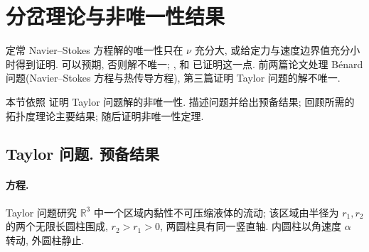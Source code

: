 \hypertarget{chapter-02-page-165}{}
\section{分岔理论与非唯一性结果}
\label{sec:ch2-bifurcation-nonuniqueness}

定常 Navier--Stokes 方程解的唯一性只在 $\nu$ 充分大, 或给定力与速度边界值充分小时得到证明. 可以预期, 否则解不唯一; ,  和  已证明这一点. 前两篇论文处理 Bénard 问题(Navier--Stokes 方程与热传导方程), 第三篇证明 Taylor 问题的解不唯一.

本节依照  证明 Taylor 问题解的非唯一性.  描述问题并给出预备结果;  回顾所需的拓扑度理论主要结果;  随后证明非唯一性定理.

\subsection{Taylor 问题. 预备结果}
\label{subsec:ch2-taylor-preliminaries}

\paragraph{方程.}
\label{subsec:ch2-taylor-equations}
Taylor 问题研究 $\mathbb R^3$ 中一个区域内黏性不可压缩液体的流动; 该区域由半径为 $r_1,r_2$ 的两个无限长圆柱围成, $r_2>r_1>0$, 两圆柱具有同一竖直轴. 内圆柱以角速度 $\alpha$ 转动, 外圆柱静止.

